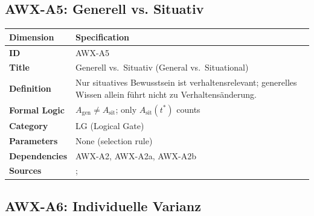 
\subsection{AWX-A5: Generell vs. Situativ}

\begin{table}[htbp]
\small
\begin{tabular}{p{3cm}p{11cm}}
\toprule
\textbf{Dimension} & \textbf{Specification} \\
\midrule
\textbf{ID} & AWX-A5 \\
\textbf{Title} & Generell vs.\ Situativ (General vs.\ Situational) \\
\textbf{Definition} & Nur situatives Bewusstsein ist verhaltensrelevant; generelles Wissen allein führt nicht zu Verhaltensänderung. \\
\textbf{Formal Logic} & $A_{\text{gen}} \neq A_{\text{sit}}$; only $A_{\text{sit}}(t^*)$ counts \\
\textbf{Category} & LG (Logical Gate) \\
\textbf{Parameters} & None (selection rule) \\
\textbf{Dependencies} & AWX-A2, AWX-A2a, AWX-A2b \\
\textbf{Sources} & \citet{bargh1996automaticity}; \citet{PAP-kahneman2003maps} \\
\bottomrule
\end{tabular}
\end{table}


\subsection{AWX-A6: Individuelle Varianz}

